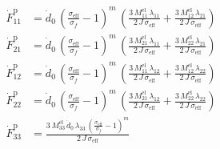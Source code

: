 \begin{align}
\dot{F}^{\mathrm p}_{11} &= \dot{d}_{0}\,{\left(\frac{\sigma _{\mathrm{eff}}}{\sigma _{f}}-1\right)}^m\,\left(\frac{3\,M_{11}^{\mathrm{el}}\,\lambda _{11}}{2\,J\,\sigma _{\mathrm{eff}}}+\frac{3\,M_{12}^{\mathrm{el}}\,\lambda _{21}}{2\,J\,\sigma _{\mathrm{eff}}}\right) \\ 
\dot{F}^{\mathrm p}_{21} &= \dot{d}_{0}\,{\left(\frac{\sigma _{\mathrm{eff}}}{\sigma _{f}}-1\right)}^m\,\left(\frac{3\,M_{21}^{\mathrm{el}}\,\lambda _{11}}{2\,J\,\sigma _{\mathrm{eff}}}+\frac{3\,M_{22}^{\mathrm{el}}\,\lambda _{21}}{2\,J\,\sigma _{\mathrm{eff}}}\right) \\ 
\dot{F}^{\mathrm p}_{12} &= \dot{d}_{0}\,{\left(\frac{\sigma _{\mathrm{eff}}}{\sigma _{f}}-1\right)}^m\,\left(\frac{3\,M_{11}^{\mathrm{el}}\,\lambda _{12}}{2\,J\,\sigma _{\mathrm{eff}}}+\frac{3\,M_{12}^{\mathrm{el}}\,\lambda _{22}}{2\,J\,\sigma _{\mathrm{eff}}}\right) \\ 
\dot{F}^{\mathrm p}_{22} &= \dot{d}_{0}\,{\left(\frac{\sigma _{\mathrm{eff}}}{\sigma _{f}}-1\right)}^m\,\left(\frac{3\,M_{21}^{\mathrm{el}}\,\lambda _{12}}{2\,J\,\sigma _{\mathrm{eff}}}+\frac{3\,M_{22}^{\mathrm{el}}\,\lambda _{22}}{2\,J\,\sigma _{\mathrm{eff}}}\right) \\ 
\dot{F}^{\mathrm p}_{33} &= \frac{3\,M_{33}^{\mathrm{el}}\,\dot{d}_{0}\,\lambda _{33}\,{\left(\frac{\sigma _{\mathrm{eff}}}{\sigma _{f}}-1\right)}^m}{2\,J\,\sigma _{\mathrm{eff}}} 
\end{align}
